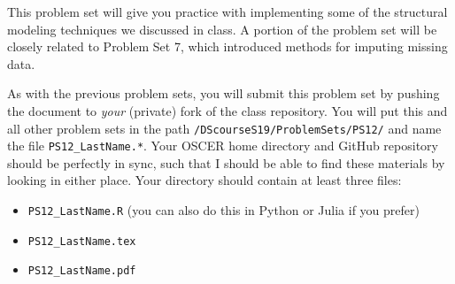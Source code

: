 \documentclass[12pt,english]{exam}
\begin{document}
This problem set will give you practice with implementing some of the structural modeling techniques we discussed in class. A portion of the problem set will be closely related to Problem Set 7, which introduced methods for imputing missing data.

As with the previous problem sets, you will submit this problem set by pushing the document to \emph{your} (private) fork of the class repository. You will put this and all other problem sets in the path \texttt{/DScourseS19/ProblemSets/PS12/} and name the file \texttt{PS12\_LastName.*}. Your OSCER home directory and GitHub repository should be perfectly in sync, such that I should be able to find these materials by looking in either place. Your directory should contain at least three files:
\begin{itemize}
    \item \texttt{PS12\_LastName.R} (you can also do this in Python or Julia if you prefer)
    \item \texttt{PS12\_LastName.tex}
    \item \texttt{PS12\_LastName.pdf}
\end{itemize}
\end{document}
